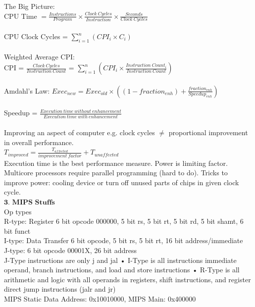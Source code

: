 \documentclass{article}
\begin{document}
The Big Picture: \\
CPU Time $= \frac{Instructions}{Program} \times \frac{Clock\
Cycles}{Instruction} \times \frac{Seconds}{Clock\ Cycles}$\\~\\
CPU Clock Cycles = $\sum_{i=1}^{n} (CPI_{i} \times C_{i})$ \\ \\
Weighted Average CPI: \\
CPI = $\frac{Clock\ Cycles}{Instruction\ Count}$ = $\sum_{i=1}^{n} (CPI_{i}
\times \frac{Instruction\ Count_{i}}{Instruction\ Count})$ \\~\\
Amdahl's Law: $Exec_{new} = Exec_{old} \times ((1-fraction_{enh}) +
\frac{fraction_{enh}}{Speedup_{enh}})$ \\~\\
Speedup = $\frac{Execution  \ time \ without \ enhancement}{Execution \ time \
with \ enhancement}$ \\~\\
Improving an aspect of computer e.g. clock cycles $\neq$ proportional
improvement in overall performance. \\
$T_{improved} = \frac{T_{affected}}{improvement \ factor} + T_{unaffected}$ \\


Execution time is the best performance measure. Power is limiting factor.
Multicore processors require parallel programming (hard to do). Tricks to
improve power: cooling device or turn off unused parts of chips in given clock
cycle. \\

$\textbf{3. MIPS Stuffs}$\\
Op types\\
R-type: Register 
6 bit opcode 000000,
5 bit rs,
5 bit rt,
5 bit rd,
5 bit shamt,
6 bit funct \\
I-type: Data Transfer
6 bit opcode,
5 bit rs,
5 bit rt,
16 bit address/immediate \\
J-type:
6 bit opcode 00001X,
26 bit address \\
J-Type instructions are only j and jal
• I-Type is all instructions immediate
operand, branch instructions, and load
and store instructions
• R-Type is all arithmetic and logic with
all operands in registers, shift
instructions, and register direct jump
instructions (jalr and jr)  \\
MIPS Static Data Address: 0x10010000, MIPS Main: 0x400000 \\
\end{document}
